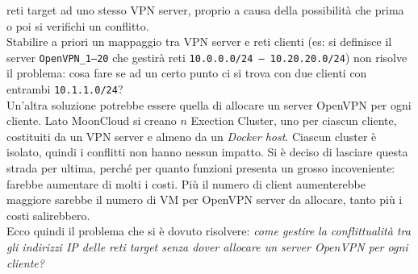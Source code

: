 reti target ad uno stesso VPN server, proprio a causa della possibilità che prima o poi
si verifichi un conflitto.\\
Stabilire a priori un mappaggio tra VPN server e reti clienti (es: si definisce
il server \texttt{OpenVPN\_1--20} che gestirà reti \texttt{10.0.0.0/24 -- 10.20.20.0/24})
non risolve il problema: cosa fare se ad un certo punto ci si trova con due clienti con
entrambi \texttt{10.1.1.0/24}?\\
Un'altra soluzione potrebbe essere quella di allocare un server OpenVPN
per ogni cliente. Lato MoonCloud si creano $n$ Exection Cluster, uno per ciascun cliente,
costituiti da un VPN server e almeno da un \textit{Docker host}. Ciascun cluster è isolato,
quindi i conflitti non hanno nessun impatto. Si è deciso di lasciare questa strada per ultima,
perché per quanto funzioni presenta un grosso incoveniente: farebbe aumentare di molti i
costi. Più il numero di client aumenterebbe maggiore sarebbe il numero di VM per OpenVPN server
da allocare, tanto più i costi salirebbero.\\
Ecco quindi il problema che si è dovuto risolvere: \textit{come gestire
la conflittualità tra gli indirizzi IP delle reti target senza dover allocare un
server OpenVPN per ogni cliente?}


